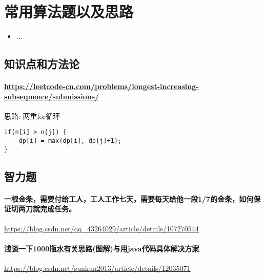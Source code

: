 \chapter{常用算法题以及思路}
\label{chap1}
\begin{itemize}[noitemsep,topsep=0pt,parsep=0pt,partopsep=0pt]
	\item ...
\end{itemize}

\section{知识点和方法论}
\subsubsection{\url{https://leetcode-cn.com/problems/longest-increasing-subsequence/submissions/}}
思路: 两重for循环
\begin{lstlisting}
if(n[i] > n[j]) {
	dp[i] = max(dp[i], dp[j]+1);
}
\end{lstlisting}

\section{智力题}

\subsubsection{一根金条，需要付给工人，工人工作七天，需要每天给他一段1/7的金条，如何保证切两刀就完成任务。}
\url{https://blog.csdn.net/qq_43264029/article/details/107270544}

\subsubsection{浅谈一下1000瓶水有关思路(图解)与用java代码具体解决方案}
\url{https://blog.csdn.net/sunkun2013/article/details/12035071}